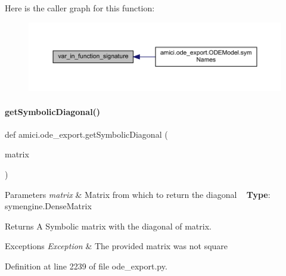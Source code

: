 Here is the caller graph for this function\+:
\nopagebreak
\begin{figure}[H]
\begin{center}
\leavevmode
\includegraphics[width=350pt]{namespaceamici_1_1ode__export_a365aaf8b78bb2db9c94b1a8087d60a16_icgraph}
\end{center}
\end{figure}
\mbox{\label{namespaceamici_1_1ode__export_aed240175cce2aa528fe24d1486c52559}} 
\paragraph{\texorpdfstring{get\+Symbolic\+Diagonal()}{getSymbolicDiagonal()}}
{\footnotesize\ttfamily def amici.\+ode\+\_\+export.\+get\+Symbolic\+Diagonal (\begin{DoxyParamCaption}\item[{}]{matrix }\end{DoxyParamCaption})}


\begin{DoxyParams}{Parameters}
{\em matrix} & Matrix from which to return the diagonal ~\newline
{\bfseries Type}\+: symengine.\+Dense\+Matrix\\
\hline
\end{DoxyParams}
\begin{DoxyReturn}{Returns}
A Symbolic matrix with the diagonal of {\ttfamily matrix}.
\end{DoxyReturn}

\begin{DoxyExceptions}{Exceptions}
{\em Exception} & The provided matrix was not square \\
\hline
\end{DoxyExceptions}


Definition at line 2239 of file ode\+\_\+export.\+py.

